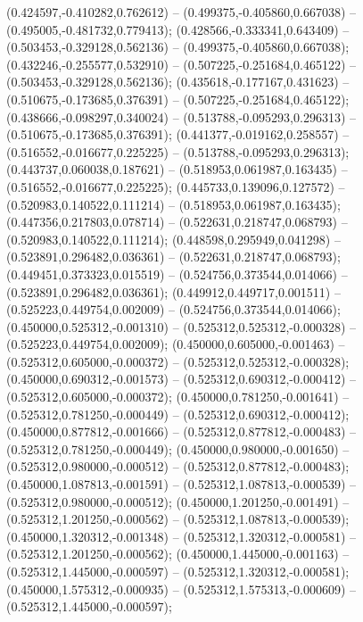  (0.424597,-0.410282,0.762612) -- (0.499375,-0.405860,0.667038) -- (0.495005,-0.481732,0.779413);
 (0.428566,-0.333341,0.643409) -- (0.503453,-0.329128,0.562136) -- (0.499375,-0.405860,0.667038);
 (0.432246,-0.255577,0.532910) -- (0.507225,-0.251684,0.465122) -- (0.503453,-0.329128,0.562136);
 (0.435618,-0.177167,0.431623) -- (0.510675,-0.173685,0.376391) -- (0.507225,-0.251684,0.465122);
 (0.438666,-0.098297,0.340024) -- (0.513788,-0.095293,0.296313) -- (0.510675,-0.173685,0.376391);
 (0.441377,-0.019162,0.258557) -- (0.516552,-0.016677,0.225225) -- (0.513788,-0.095293,0.296313);
 (0.443737,0.060038,0.187621) -- (0.518953,0.061987,0.163435) -- (0.516552,-0.016677,0.225225);
 (0.445733,0.139096,0.127572) -- (0.520983,0.140522,0.111214) -- (0.518953,0.061987,0.163435);
 (0.447356,0.217803,0.078714) -- (0.522631,0.218747,0.068793) -- (0.520983,0.140522,0.111214);
 (0.448598,0.295949,0.041298) -- (0.523891,0.296482,0.036361) -- (0.522631,0.218747,0.068793);
 (0.449451,0.373323,0.015519) -- (0.524756,0.373544,0.014066) -- (0.523891,0.296482,0.036361);
 (0.449912,0.449717,0.001511) -- (0.525223,0.449754,0.002009) -- (0.524756,0.373544,0.014066);
 (0.450000,0.525312,-0.001310) -- (0.525312,0.525312,-0.000328) -- (0.525223,0.449754,0.002009);
 (0.450000,0.605000,-0.001463) -- (0.525312,0.605000,-0.000372) -- (0.525312,0.525312,-0.000328);
 (0.450000,0.690312,-0.001573) -- (0.525312,0.690312,-0.000412) -- (0.525312,0.605000,-0.000372);
 (0.450000,0.781250,-0.001641) -- (0.525312,0.781250,-0.000449) -- (0.525312,0.690312,-0.000412);
 (0.450000,0.877812,-0.001666) -- (0.525312,0.877812,-0.000483) -- (0.525312,0.781250,-0.000449);
 (0.450000,0.980000,-0.001650) -- (0.525312,0.980000,-0.000512) -- (0.525312,0.877812,-0.000483);
 (0.450000,1.087813,-0.001591) -- (0.525312,1.087813,-0.000539) -- (0.525312,0.980000,-0.000512);
 (0.450000,1.201250,-0.001491) -- (0.525312,1.201250,-0.000562) -- (0.525312,1.087813,-0.000539);
 (0.450000,1.320312,-0.001348) -- (0.525312,1.320312,-0.000581) -- (0.525312,1.201250,-0.000562);
 (0.450000,1.445000,-0.001163) -- (0.525312,1.445000,-0.000597) -- (0.525312,1.320312,-0.000581);
 (0.450000,1.575312,-0.000935) -- (0.525312,1.575313,-0.000609) -- (0.525312,1.445000,-0.000597);
